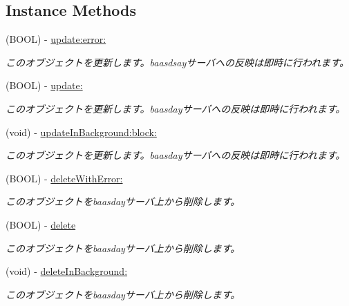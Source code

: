 \subsection*{Instance Methods}
\begin{DoxyCompactItemize}
\item 
(B\-O\-O\-L) -\/ \hyperlink{interface_b_d_object_ab80f1486814b7c8298963a2206b75730}{update\-:error\-:}
\begin{DoxyCompactList}\small\item\em このオブジェクトを更新します。baasdsayサーバへの反映は即時に行われます。 \end{DoxyCompactList}\item 
(B\-O\-O\-L) -\/ \hyperlink{interface_b_d_object_acb8238e46c15d731d1a21985d865ac44}{update\-:}
\begin{DoxyCompactList}\small\item\em このオブジェクトを更新します。baasdayサーバへの反映は即時に行われます。 \end{DoxyCompactList}\item 
(void) -\/ \hyperlink{interface_b_d_object_ae8d683ea58540f92f8aa544d297f608b}{update\-In\-Background\-:block\-:}
\begin{DoxyCompactList}\small\item\em このオブジェクトを更新します。baasdayサーバへの反映は即時に行われます。 \end{DoxyCompactList}\item 
(B\-O\-O\-L) -\/ \hyperlink{interface_b_d_object_a4956ebcf18ad88e8aa333543054093fe}{delete\-With\-Error\-:}
\begin{DoxyCompactList}\small\item\em このオブジェクトをbaasdayサーバ上から削除します。 \end{DoxyCompactList}\item 
(B\-O\-O\-L) -\/ \hyperlink{interface_b_d_object_a98f8e5aad3fb13e207dc4c678e0ef26e}{delete}
\begin{DoxyCompactList}\small\item\em このオブジェクトをbaasdayサーバ上から削除します。 \end{DoxyCompactList}\item 
(void) -\/ \hyperlink{interface_b_d_object_a3315930e8c242cbf0c36dcd539d45a99}{delete\-In\-Background\-:}
\begin{DoxyCompactList}\small\item\em このオブジェクトをbaasdayサーバ上から削除します。 \end{DoxyCompactList}\end{DoxyCompactItemize}
